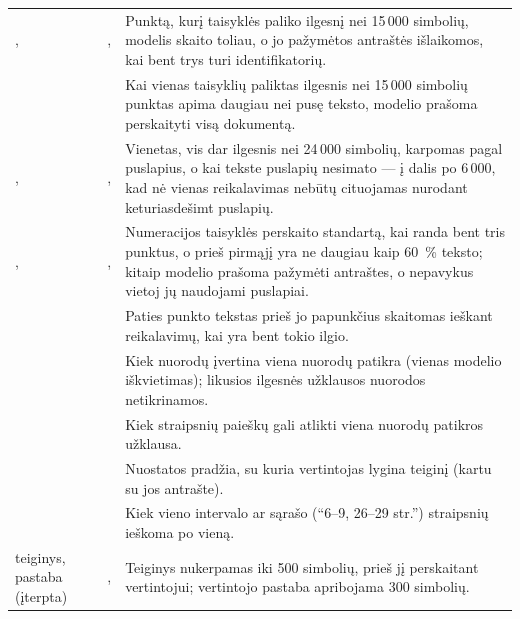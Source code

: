 \begin{xltabular}{\textwidth}{@{}L{44mm}L{19mm}Y@{}}
,  & ,  & Punktą, kurį taisyklės paliko ilgesnį nei 15\,000 simbolių, modelis skaito toliau, o jo pažymėtos antraštės išlaikomos, kai bent trys turi identifikatorių. \\
 &  & Kai vienas taisyklių paliktas ilgesnis nei 15\,000 simbolių punktas apima daugiau nei pusę teksto, modelio prašoma perskaityti visą dokumentą. \\
,  & ,  & Vienetas, vis dar ilgesnis nei 24\,000 simbolių, karpomas pagal puslapius, o kai tekste puslapių nesimato --- į dalis po 6\,000, kad nė vienas reikalavimas nebūtų cituojamas nurodant keturiasdešimt puslapių. \\
,  & ,  & Numeracijos taisyklės perskaito standartą, kai randa bent tris punktus, o prieš pirmąjį yra ne daugiau kaip 60~\% teksto; kitaip modelio prašoma pažymėti antraštes, o nepavykus vietoj jų naudojami puslapiai. \\
 &  & Paties punkto tekstas prieš jo papunkčius skaitomas ieškant reikalavimų, kai yra bent tokio ilgio. \\
 &  & Kiek nuorodų įvertina viena nuorodų patikra (vienas modelio iškvietimas); likusios ilgesnės užklausos nuorodos netikrinamos. \\
 &  & Kiek straipsnių paieškų gali atlikti viena nuorodų patikros užklausa. \\
 &  & Nuostatos pradžia, su kuria vertintojas lygina teiginį (kartu su jos antrašte). \\
 &  & Kiek vieno intervalo ar sąrašo (\enquote{6--9, 26--29 str.}) straipsnių ieškoma po vieną. \\
teiginys, pastaba (įterpta) & ,  & Teiginys nukerpamas iki 500 simbolių, prieš jį perskaitant vertintojui; vertintojo pastaba apribojama 300 simbolių. \\
\end{xltabular}

